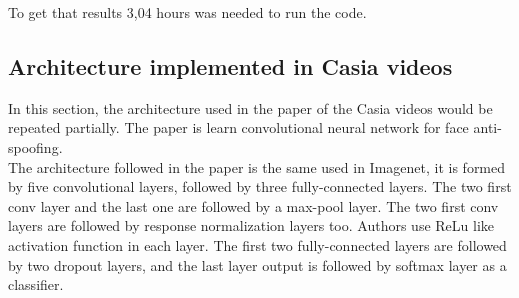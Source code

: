 To get that results 3,04 hours was needed to run the code.\\






\clearpage

\subsection{Architecture implemented in Casia videos}
In this section, the architecture used in the paper of the Casia videos would be repeated partially. The paper is learn convolutional neural network for face anti-spoofing.\\

The architecture followed in the paper is the same used in Imagenet, it is formed by five convolutional layers, followed by three fully-connected layers. The two first conv layer and the last one are followed by a max-pool layer. The two first conv layers are followed by response normalization layers too. Authors use ReLu like activation function in each layer. The first two fully-connected layers are followed by two dropout layers, and the last layer output is followed by softmax layer as a classifier.\\

